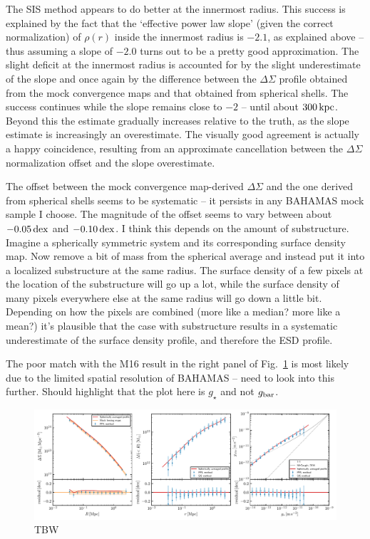 \documentclass[usenatbib]{mnras}
\begin{document}
The SIS method appears to do better at the innermost radius. This success is explained by the fact that the `effective power law slope' (given the correct normalization) of $\rho(r)$ inside the innermost radius is $-2.1$, as explained above -- thus assuming a slope of $-2.0$ turns out to be a pretty good approximation. The slight deficit at the innermost radius is accounted for by the slight underestimate of the slope and once again by the difference between the $\Delta\Sigma$ profile obtained from the mock convergence maps and that obtained from spherical shells. The success continues while the slope remains close to $-2$ -- until about $300\,{\rm kpc}$. Beyond this the estimate gradually increases relative to the truth, as the slope estimate is increasingly an overestimate. The visually good agreement is actually a happy coincidence, resulting from an approximate cancellation between the $\Delta\Sigma$ normalization offset and the slope overestimate.

The offset between the mock convergence map-derived $\Delta\Sigma$ and the one derived from spherical shells seems to be systematic -- it persists in any BAHAMAS mock sample I choose. The magnitude of the offset seems to vary between about $-0.05\,{\rm dex}$ and $-0.10\,{\rm dex}$. I think this depends on the amount of substructure. Imagine a spherically symmetric system and its corresponding surface density map. Now remove a bit of mass from the spherical average and instead put it into a localized substructure at the same radius. The surface density of a few pixels at the location of the substructure will go up a lot, while the surface density of many pixels everywhere else at the same radius will go down a little bit. Depending on how the pixels are combined (more like a median? more like a mean?) it's plausible that the case with substructure results in a systematic underestimate of the surface density profile, and therefore the ESD profile.

The poor match with the M16 result in the right panel of Fig.~\ref{fig:compare_method} is most likely due to the limited spatial resolution of BAHAMAS -- need to look into this further. Should highlight that the plot here is $g_\star$ and not $g_{\rm bar}$.

\begin{figure}
  \includegraphics[width=1.\textwidth]{Figures/compare_method}
  \caption{TBW}
  \label{fig:compare_method}
\end{figure}
\end{document}
